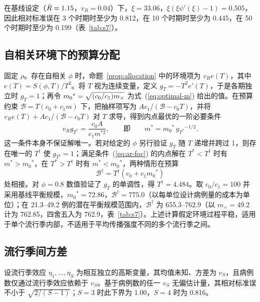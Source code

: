 在基线设定（$\bar{R}=1.15$，$v_R=0.04$）下，$\xi=33.06$，$\xi(\xi\psi'(\xi)-1)=0.505$，因此相对标准误在 3 个时期时至少为 0.812，在 10 个时期时至少为 0.445，在 50 个时期时至少为 0.199（表~\ref{tab:s7}）。

\subsection{自相关环境下的预算分配}
\label{app:budget-ar}

固定 $\rho$。存在自相关 $\phi$ 时，命题~\ref{prop:allocation} 中的环境项为 $v_Re(T)$，其中 $e(T)=S(\phi,T)/T^2$。将 $T$ 视为连续变量，定义 $g_T=-T^2e'(T)$，于是各期独立时 $g_T=1$；再令 $m_0{}^*=\sqrt{(c_0/c_1)m_{\times}}$ 为式~(\ref{eq:optimal-m}) 给出的值。在预算约束 $\mathcal{B}=T(c_0+c_1m)$ 下，把抽样项写为 $Ac_1/(\mathcal{B}-c_0T)$，并将 $v_Re(T)+Ac_1/(\mathcal{B}-c_0T)$ 对 $T$ 求导，得到内点最优的一阶必要条件
\begin{equation}
  v_Rg_{T^*}=\frac{c_0A}{c_1m^{*2}},\qquad\text{即}\qquad m^*=m_0{}^*\,g_{T^*}{}^{-1/2}.
  \label{eq:ar-foc}
\end{equation}
这一条件本身不保证解唯一。若对给定的 $\phi$ 另行验证 $g_T$ 随 $T$ 递增并跨过 1，则存在唯一的 $T^\dagger$ 使 $g_{T^\dagger}=1$；满足条件~(\ref{eq:ar-foc}) 的内点解在 $T^*<T^\dagger$ 时有 $m^*>m_0{}^*$，在 $T^*>T^\dagger$ 时有 $m^*<m_0{}^*$，两种情形在预算
\begin{equation}
  \mathcal{B}^\dagger=T^\dagger\left(c_0+c_1m_0{}^*\right)
  \label{eq:b-dagger}
\end{equation}
处相接。对 $\phi=0.8$ 数值验证了 $g_T$ 的单调性，得 $T^\dagger=4.484$。取 $c_0/c_1=100$ 并采用基线平衡规模，$m_0{}^*=72.86$，$\mathcal{B}^\dagger=775.0$（以每单位设计病例量的成本为单位）；在 21.3--49.2 例的潜在平衡规模范围内，$\mathcal{B}^\dagger$ 为 655.3--762.9（以 $m_\times=49.2$ 计为 762.85，四舍五入为 762.9，表~\ref{tab:s7}）。上述计算假定环境过程平稳，适用于单个流行季内部，不适用于平均传播强度不同的多个流行季之间。

\subsection{流行季间方差}
\label{app:seasons}

\begin{corollary}[流行季层面的下界]
\label{cor:season}
设流行季效应 $\eta_1,\dots,\eta_S$ 为相互独立的高斯变量，其均值未知、方差为 $v_S$，且病例数仅通过流行季效应依赖于 $v_S$。基于病例数的任一 $v_S$ 无偏估计量，其相对标准误不小于 $\sqrt{2/(S-1)}$；$S=3$ 时此下界为 1.00，$S=4$ 时为 0.816。
\end{corollary}

